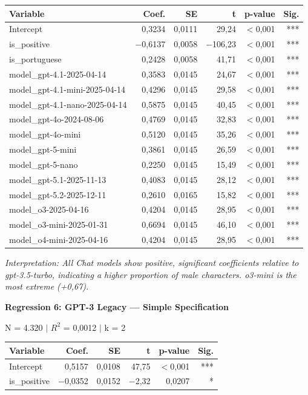 \documentclass[jair,11pt,letterpaper]{article}
\begin{document}
\begin{table}[H]
\centering
\small
\begin{tabular}{lrrrrr}
\toprule
\textbf{Variable} & \textbf{Coef.} & \textbf{SE} & \textbf{t} & \textbf{p-value} & \textbf{Sig.} \\
\midrule
Intercept & 0,3234 & 0,0111 & 29,24 & $<$0,001 & *** \\
is\_positive & $-$0,6137 & 0,0058 & $-$106,23 & $<$0,001 & *** \\
is\_portuguese & 0,2428 & 0,0058 & 41,71 & $<$0,001 & *** \\
model\_gpt-4.1-2025-04-14 & 0,3583 & 0,0145 & 24,67 & $<$0,001 & *** \\
model\_gpt-4.1-mini-2025-04-14 & 0,4296 & 0,0145 & 29,58 & $<$0,001 & *** \\
model\_gpt-4.1-nano-2025-04-14 & 0,5875 & 0,0145 & 40,45 & $<$0,001 & *** \\
model\_gpt-4o-2024-08-06 & 0,4769 & 0,0145 & 32,83 & $<$0,001 & *** \\
model\_gpt-4o-mini & 0,5120 & 0,0145 & 35,26 & $<$0,001 & *** \\
model\_gpt-5-mini & 0,3861 & 0,0145 & 26,59 & $<$0,001 & *** \\
model\_gpt-5-nano & 0,2250 & 0,0145 & 15,49 & $<$0,001 & *** \\
model\_gpt-5.1-2025-11-13 & 0,4083 & 0,0145 & 28,12 & $<$0,001 & *** \\
model\_gpt-5.2-2025-12-11 & 0,2610 & 0,0165 & 15,82 & $<$0,001 & *** \\
model\_o3-2025-04-16 & 0,4204 & 0,0145 & 28,95 & $<$0,001 & *** \\
model\_o3-mini-2025-01-31 & 0,6694 & 0,0145 & 46,10 & $<$0,001 & *** \\
model\_o4-mini-2025-04-16 & 0,4204 & 0,0145 & 28,95 & $<$0,001 & *** \\
\bottomrule
\end{tabular}
\end{table}

\noindent\textit{Interpretation: All Chat models show positive, significant coefficients
relative to gpt-3.5-turbo, indicating a higher proportion of
male characters. o3-mini is the most extreme (+0,67).}

\vspace{0.5cm}
\noindent\textbf{Regression 6: GPT-3 Legacy --- Simple Specification}

\noindent N = 4.320 $|$ $R^2$ = 0,0012 $|$ k = 2

\begin{table}[H]
\centering
\begin{tabular}{lrrrrr}
\toprule
\textbf{Variable} & \textbf{Coef.} & \textbf{SE} & \textbf{t} & \textbf{p-value} & \textbf{Sig.} \\
\midrule
Intercept & 0,5157 & 0,0108 & 47,75 & $<$0,001 & *** \\
is\_positive & $-$0,0352 & 0,0152 & $-$2,32 & 0,0207 & * \\
\bottomrule
\end{tabular}
\end{table}
\end{document}
